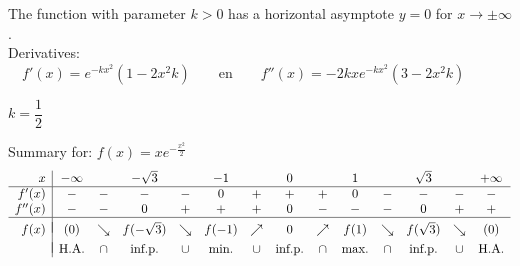 \begin{Answer}\phantom{}
    
        \Question The function with parameter $k>0$ has a horizontal asymptote $y=0$ for $x \rightarrow \pm \infty$. \\
        Derivatives: $\quad f'(x)=e^{-kx^2} \left( 1 - 2x^2k \right)\qquad\mbox{en}\qquad f''(x)=-2kxe^{-kx^2} \left( 3 - 2x^2k \right)$
        
        \Question $k=\dfrac{1}{2}$
        
        \Question 
       Summary for: $f(x) = x e^{-\frac{x^2}{2}}$
        \[ \begin{array}{r|ccccccccccccc}
    		x & -\infty & & - \sqrt{3} &  & -1 &  & 0 &  & 1 & &\sqrt{3} &  &+\infty \\
    		\hline
    		f'(x)   & - & - & - & - & 0 & + & + & + & 0 & - & - & - & - \\
    		f''(x)  & - & - & 0 & + & + & + & 0 & - & - & - & 0 & + & + \\
    		\hline
    		&&&&&&&&&\vspace{-0.3cm}\\
    		f(x)    & (0) & \searrow  & f(-\sqrt{3}) &  \searrow & f(-1) & \nearrow & 0 & \nearrow & f(1) & \searrow & f(\sqrt{3}) & \searrow & (0)\\
    		&&&&&&&&&\vspace{-0.3cm}\\                                                                              
    		& \mbox{H.A.} & \cap & \mbox{inf.p.} & \cup & \mbox{min.} & \cup & \mbox{inf.p.} & \cap &  \mbox{max.} & \cap & \mbox{inf.p.} & \cup & \mbox{H.A.} \\
    		\end{array}\]
   
\end{Answer}
\fi




